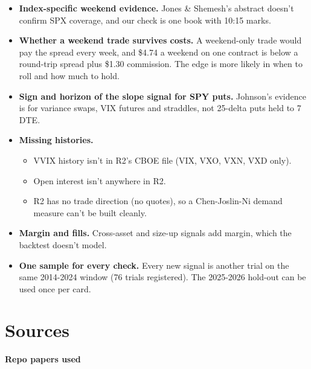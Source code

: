 \documentclass{article}
\begin{document}
\begin{itemize}

\item \textbf{Index-specific weekend evidence.} Jones \& Shemesh's abstract doesn't confirm SPX coverage, and our check is one book with 10:15 marks.

\item \textbf{Whether a weekend trade survives costs.} A weekend-only trade would pay the spread every week, and \$4.74 a weekend on one contract is below a round-trip spread plus \$1.30 commission. The edge is more likely in when to roll and how much to hold.

\item \textbf{Sign and horizon of the slope signal for SPY puts.} Johnson's evidence is for variance swaps, VIX futures and straddles, not 25-delta puts held to 7 DTE.

\item \textbf{Missing histories.}

\begin{itemize}

\item VVIX history isn't in R2's CBOE file (VIX, VXO, VXN, VXD only).

\item Open interest isn't anywhere in R2.

\item R2 has no trade direction (no quotes), so a Chen-Joslin-Ni demand measure can't be built cleanly.

\end{itemize}

\item \textbf{Margin and fills.} Cross-asset and size-up signals add margin, which the backtest doesn't model.

\item \textbf{One sample for every check.} Every new signal is another trial on the same 2014-2024 window (76 trials registered). The 2025-2026 hold-out can be used once per card.

\end{itemize}

\section{Sources}

\textbf{Repo papers used}
\end{document}
